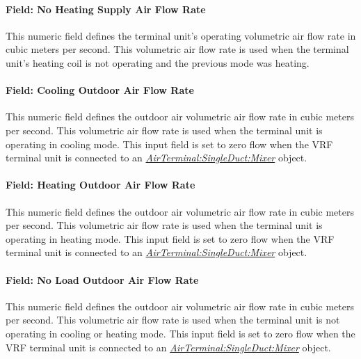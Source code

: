 \paragraph{Field: No Heating Supply Air Flow Rate}\label{field-no-heating-supply-air-flow-rate-000}

This numeric field defines the terminal unit's operating volumetric air flow rate in cubic meters per second. This volumetric air flow rate is used when the terminal unit's heating coil is not operating and the previous mode was heating.

\paragraph{Field: Cooling Outdoor Air Flow Rate}\label{field-cooling-outdoor-air-flow-rate-3}

This numeric field defines the outdoor air volumetric air flow rate in cubic meters per second. This volumetric air flow rate is used when the terminal unit is operating in cooling mode. This input field is set to zero flow when the VRF terminal unit is connected to an \textit{\hyperref[airterminalsingleductmixer]{AirTerminal:SingleDuct:Mixer}} object.

\paragraph{Field: Heating Outdoor Air Flow Rate}\label{field-heating-outdoor-air-flow-rate-3}

This numeric field defines the outdoor air volumetric air flow rate in cubic meters per second. This volumetric air flow rate is used when the terminal unit is operating in heating mode. This input field is set to zero flow when the VRF terminal unit is connected to an \textit{\hyperref[airterminalsingleductmixer]{AirTerminal:SingleDuct:Mixer}} object.

\paragraph{Field: No Load Outdoor Air Flow Rate}\label{field-no-load-outdoor-air-flow-rate-2}

This numeric field defines the outdoor air volumetric air flow rate in cubic meters per second. This volumetric air flow rate is used when the terminal unit is not operating in cooling or heating mode. This input field is set to zero flow when the VRF terminal unit is connected to an \textit{\hyperref[airterminalsingleductmixer]{AirTerminal:SingleDuct:Mixer}} object.

